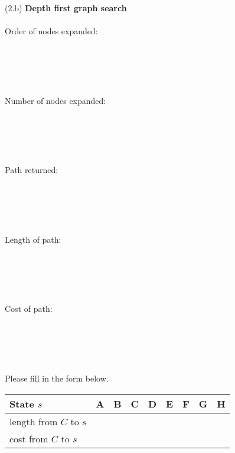 \documentclass{article}
\begin{document}
\newpage


\noindent (2.b) \textbf{Depth first graph search}\\
~\\
Order of nodes expanded:\\
~\\
~\\
~\\
~\\
~\\
Number of nodes expanded:\\
~\\
~\\
~\\
~\\
~\\
Path returned:\\
~\\
~\\
~\\
~\\
~\\
Length of path:\\
~\\
~\\
~\\
~\\
~\\
Cost of path:\\
~\\
~\\
~\\
~\\
~\\
Please fill in the form below.
\renewcommand\arraystretch{1.5}
\begin{table}[tbh!]
\begin{center}
    \begin{tabular}{|p{2cm}| p{1cm}| p{1cm} | p{1cm}| p{1cm} | p{1cm}| p{1cm} | p{1cm}| p{1cm}|}
\hline
    State $s$  & A & B & C & D & E & F & G & H \\ \hline
    length from $C$ to $s$  &   &   &   &  &   &   &   &  \\\hline
    cost from $C$ to $s$ &   &   &   &  &   &   &   &  \\
\hline
\end{tabular}
\end{center}
\end{table}



\newpage
\end{document}
